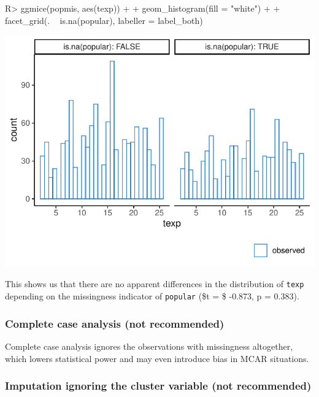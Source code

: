 \documentclass[
]{jss}
\begin{document}
\begin{CodeChunk}
\begin{CodeInput}
R> ggmice(popmis, aes(texp)) +
+   geom_histogram(fill = "white") +
+   facet_grid(. ~ is.na(popular), labeller = label_both)
\end{CodeInput}


\begin{center}\includegraphics{Imputation_of_Incomplete_Multilevel_Data_files/figure-latex/pop-hist-1} \end{center}

\end{CodeChunk}

This shows us that there are no apparent differences in the distribution
of \texttt{texp} depending on the missingness indicator of
\texttt{popular} (\$t = \$ -0.873, p = 0.383).

\hypertarget{complete-case-analysis-not-recommended}{%
\subsubsection{Complete case analysis (not
recommended)}\label{complete-case-analysis-not-recommended}}

Complete case analysis ignores the observations with missingness
altogether, which lowers statistical power and may even introduce bias
in MCAR situations.

\hypertarget{imputation-ignoring-the-cluster-variable-not-recommended}{%
\subsubsection{Imputation ignoring the cluster variable (not
recommended)}\label{imputation-ignoring-the-cluster-variable-not-recommended}}
\end{document}
